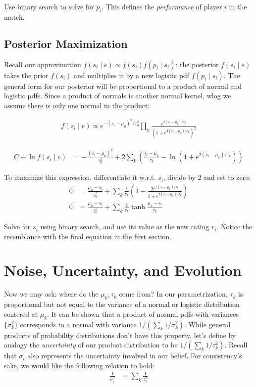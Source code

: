 \documentclass{article}
\begin{document}
Use binary search to solve for $p_i$. This defines the \emph{performance} of player $i$ in the match.

\subsection{Posterior Maximization}

Recall our approximation $f(s_i\mid e) \propto f(s_i)f(p_i\mid s_i)$: the posterior $f(s_i \mid e)$ takes the prior $f(s_i)$ and multiplies it by a new logistic pdf $f(p_i\mid s_i)$. The general form for our posterior will be proportional to a product of normal and logistic pdfs. Since a product of normals is another normal kernel, wlog we assume there is only one normal in the product:

\begin{align}
f(s_i\mid e) \propto e^{-(s_i-\mu_0)^2/\tau_0^2} \prod_k \frac { e^{2(s_i-\mu_k)/\tau_k} } { \left(1 + e^{2(s_i-\mu_k)/\tau_k} \right)^2 }
\end{align}

\begin{align}
C + \ln f(s_i \mid e) &= -\frac{(s_i-\mu_0)^2}{\tau_0^2} + 2\sum_k \left( \frac{s_i-\mu_k}{\tau_k} - \ln(1 + e^{2(s_i-\mu_k)/\tau_k}) \right)
\end{align}

To maximize this expression, differentiate it w.r.t. $s_i$, divide by 2 and set to zero:
\begin{align}
0 &= \frac{\mu_0-s_i}{\tau_0^2} + \sum_k \frac{1}{\tau_k}\left( 1 - \frac {2e^{2(s_i-\mu_k)/\tau_k}} {1 + e^{2(s_i-\mu_k)/\tau_k}} \right)
\\0 &=  \frac{\mu_0-s_i}{\tau_0^2} + \sum_k \frac{1}{\tau_k} \tanh \frac {\mu_k-s_i} {\tau_k}
\end{align}

Solve for $s_i$ using binary search, and use its value as the new rating $r_i$. Notice the resemblance with the final equation in the first section.

\section{Noise, Uncertainty, and Evolution}

Now we may ask: where do the $\mu_k,\tau_k$ come from? In our parametrization, $\tau_k$ is proportional but not equal to the variance of a normal or logistic distribution centered at $\mu_k$. It can be shown that a product of normal pdfs with variances $\{\sigma_k^2\}$ corresponds to a normal with variance $1/(\sum_k 1/\sigma_k^2)$. While general products of probability distributions don't have this property, let's define by analogy the \emph{uncertainty} of our product distribution to be $1/(\sum_k 1/\tau_k^2)$. Recall that $\sigma_i$ also represents the uncertainty involved in our belief. For consistency's sake, we would like the following relation to hold:
\begin{align}
\frac{1}{\sigma_i^2} &= \sum_k \frac{1}{\tau_k^2}
\end{align}
\end{document}
